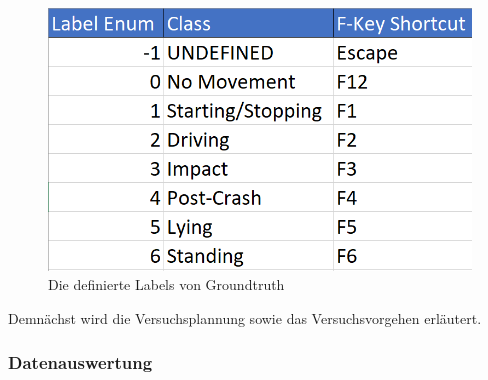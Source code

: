 \begin{figure}[H]
	\centering
	\includegraphics[width=0.6\linewidth]{Bilder/TabCalimotoLabelsID.png}
	\caption{Die definierte Labels von Groundtruth}
	\label{fig:TabCalimotoLabelsID}
\end{figure}

Demnächst wird die Versuchsplannung sowie das Versuchsvorgehen erläutert.



\subsubsection{Datenauswertung}

























